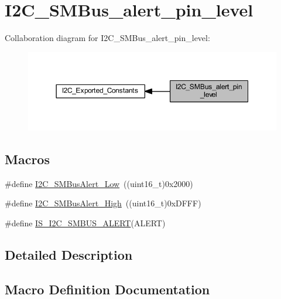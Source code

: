 \hypertarget{group___i2_c___s_m_bus__alert__pin__level}{}\section{I2\+C\+\_\+\+S\+M\+Bus\+\_\+alert\+\_\+pin\+\_\+level}
\label{group___i2_c___s_m_bus__alert__pin__level}
Collaboration diagram for I2\+C\+\_\+\+S\+M\+Bus\+\_\+alert\+\_\+pin\+\_\+level\+:
\nopagebreak
\begin{figure}[H]
\begin{center}
\leavevmode
\includegraphics[width=350pt]{group___i2_c___s_m_bus__alert__pin__level}
\end{center}
\end{figure}
\subsection*{Macros}
\begin{DoxyCompactItemize}
\item 
\#define \hyperlink{group___i2_c___s_m_bus__alert__pin__level_ga6f923166107afb8aad1d7d1a87048d6e}{I2\+C\+\_\+\+S\+M\+Bus\+Alert\+\_\+\+Low}~((uint16\+\_\+t)0x2000)
\item 
\#define \hyperlink{group___i2_c___s_m_bus__alert__pin__level_gac3ab64f43ef90f0f83f9c88981aaa862}{I2\+C\+\_\+\+S\+M\+Bus\+Alert\+\_\+\+High}~((uint16\+\_\+t)0x\+D\+F\+F\+F)
\item 
\#define \hyperlink{group___i2_c___s_m_bus__alert__pin__level_ga61b0c91563eb4bd598329241fe7d3bb4}{I\+S\+\_\+\+I2\+C\+\_\+\+S\+M\+B\+U\+S\+\_\+\+A\+L\+E\+RT}(A\+L\+E\+RT)
\end{DoxyCompactItemize}


\subsection{Detailed Description}


\subsection{Macro Definition Documentation}
\mbox{\label{group___i2_c___s_m_bus__alert__pin__level_gac3ab64f43ef90f0f83f9c88981aaa862}} 
